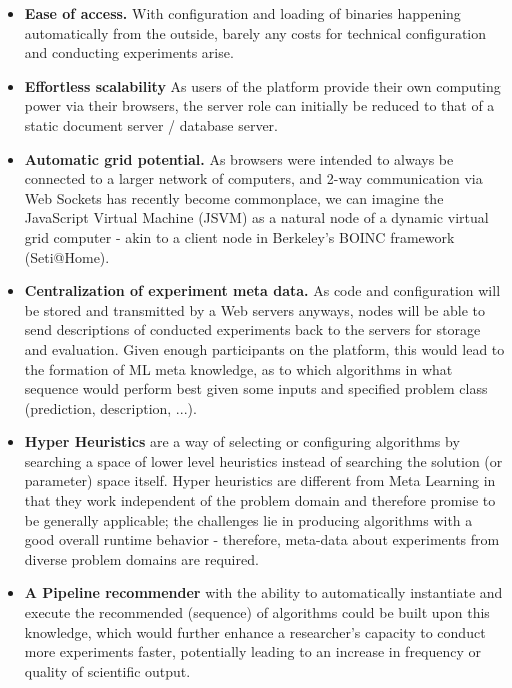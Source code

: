 \begin{itemize}
	\item \textbf{Ease of access.} With configuration and loading of binaries happening automatically from the outside, barely any costs for technical configuration and conducting experiments arise.
	
	\item \textbf{Effortless scalability} As users of the platform provide their own computing power via their browsers, the server role can initially be reduced to that of a static document server / database server.
	
	\item \textbf{Automatic grid potential.} As browsers were intended to always be connected to a larger network of computers, and 2-way communication via Web Sockets has recently become commonplace, we can imagine the JavaScript Virtual Machine (JSVM) as a natural node of a dynamic virtual grid computer - akin to a client node in Berkeley's BOINC framework (Seti@Home).
	
	\item \textbf{Centralization of experiment meta data.} As code and configuration will be stored and transmitted by a Web servers anyways, nodes will be able to send descriptions of conducted experiments back to the servers for storage and evaluation. Given enough participants on the platform, this would lead to the formation of ML meta knowledge, as to which algorithms in what sequence would perform best given some inputs and specified problem class (prediction, description, ...).
	
	\item \textbf{Hyper Heuristics} are a way of selecting or configuring algorithms by searching a space of lower level heuristics instead of searching the solution (or parameter) space itself. Hyper heuristics are different from Meta Learning in that they work independent of the problem domain and therefore promise to be generally applicable; the challenges lie in producing algorithms with a good overall runtime behavior - therefore, meta-data about experiments from diverse problem domains are required.
	
	\item \textbf{A Pipeline recommender} with the ability to automatically instantiate and execute the recommended (sequence) of algorithms could be built upon this knowledge, which would further enhance a researcher's capacity to conduct more experiments faster, potentially leading to an increase in frequency or quality of scientific output.
	

\end{itemize}
